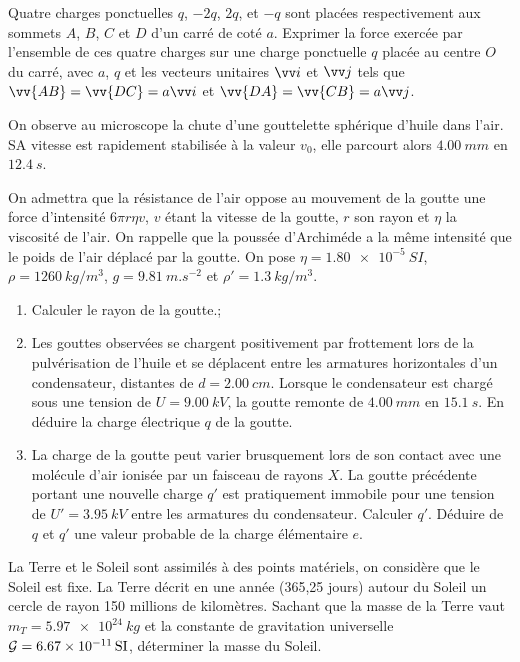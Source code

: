 \begin{exercice}
  Quatre charges ponctuelles $q$, $-2q$, $2q$, et $-q$ sont placées respectivement aux sommets $A$, $B$, $C$ et $D$ d'un carré de coté $a$. Exprimer la force exercée par l'ensemble de ces quatre charges sur une charge ponctuelle $q$ placée au centre $O$ du carré, avec $a$, $q$ et les vecteurs unitaires $\vi$ et $\vj$ tels que $\vv{AB}=\vv{DC}=a\vi$ et $\vv{DA}=\vv{CB}=a\vj$.
\end{exercice}
%
\begin{exercice}
On observe au microscope la chute d'une gouttelette sphérique d'huile dans l'air. SA vitesse est rapidement stabilisée à la valeur $v_0$, elle parcourt alors $\SI{4,00}{mm}$ en $\SI{12,4}{s}$.

On admettra que la résistance de l'air oppose au mouvement de la goutte une force d'intensité $6\pi r \eta v$, $v$ étant la vitesse de la goutte, $r$ son rayon et $\eta$ la viscosité de l'air. On rappelle que la poussée d'Archiméde a la même intensité que le poids de l'air déplacé par la goutte. On pose $\eta=\SI{1,80e-5}{SI}$, $\rho=\SI{1260}{kg/m^3}$, $g=\SI{9.81}{m.s^{-2}}$ et $\rho'=\SI{1,3}{kg/m^3}$.

  \begin{enumerate}
  \item  Calculer le rayon de la goutte.;
  \item Les gouttes observées se chargent positivement par frottement lors de la pulvérisation de l'huile et se déplacent entre les armatures horizontales d'un condensateur, distantes de $d=\SI{2,00}{cm}$. Lorsque le condensateur est chargé sous une tension de $U=\SI{9,00}{kV}$, la goutte remonte de $\SI{4,00}{mm}$ en $\SI{15.1}{s}$. En déduire la charge électrique $q$ de la goutte.
  \item La charge de la goutte peut varier brusquement lors de son contact avec une molécule d'air ionisée par un faisceau de rayons $X$. La goutte précédente portant une nouvelle charge $q'$ est pratiquement immobile pour une tension de $U'=\SI{3,95}{kV}$ entre les armatures du condensateur. Calculer $q'$. Déduire de $q$ et $q'$ une valeur probable de la charge élémentaire $e$.
  \end{enumerate}
\end{exercice}

\begin{exercice}
  La Terre et le Soleil sont assimilés à des points matériels, on considère que le Soleil est fixe. La Terre décrit en une année (365,25 jours) autour du Soleil un cercle de rayon 150 millions de kilomètres. Sachant que la masse de la Terre vaut $m_T=\SI{5,97e24}{kg}$ et la constante de gravitation universelle $\mathcal{G}=\SI{6.67e-11}{SI}$, déterminer la masse du Soleil.
\end{exercice}

